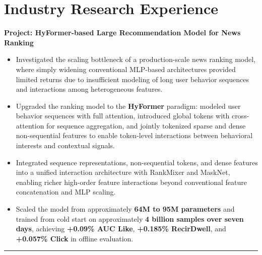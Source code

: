 \documentclass{resume}
\begin{document}
\section{Industry Research Experience}


\textbf{Project: HyFormer-based Large Recommendation Model for News Ranking}

\begin{itemize}

\item
Investigated the scaling bottleneck of a production-scale news ranking model,
where simply widening conventional MLP-based architectures provided limited
returns due to insufficient modeling of long user behavior sequences and
interactions among heterogeneous features.

\item
Upgraded the ranking model to the \textbf{HyFormer} paradigm:
modeled user behavior sequences with full attention, introduced global tokens
with cross-attention for sequence aggregation, and jointly tokenized sparse and
dense non-sequential features to enable token-level interactions between
behavioral interests and contextual signals.

\item
Integrated sequence representations, non-sequential tokens, and dense features
into a unified interaction architecture with RankMixer and MaskNet, enabling
richer high-order feature interactions beyond conventional feature
concatenation and MLP scaling.

\item
Scaled the model from approximately \textbf{64M to 95M parameters} and trained
from cold start on approximately \textbf{4 billion samples over seven days},
achieving \textbf{+0.09\% AUC Like}, \textbf{+0.185\% RecirDwell}, and
\textbf{+0.057\% Click} in offline evaluation.

\end{itemize}

\vspace{-0.3em}
\noindent\rule{\textwidth}{0.2pt}

\end{document}
